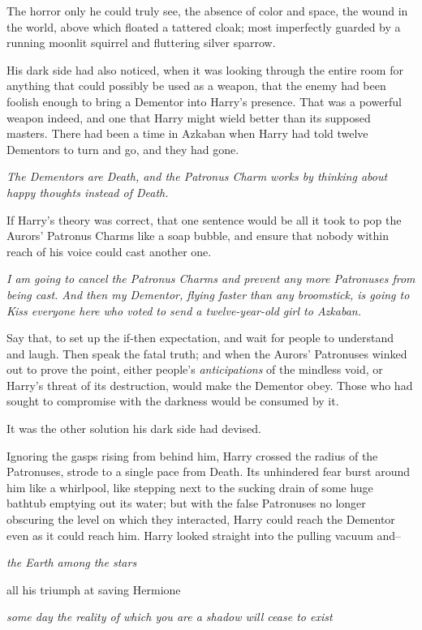 The horror only he could truly see, the absence of color and space, the wound in the world, above which floated a tattered cloak; most imperfectly guarded by a running moonlit squirrel and fluttering silver sparrow.

His dark side had also noticed, when it was looking through the entire room for anything that could possibly be used as a weapon, that the enemy had been foolish enough to bring a Dementor into Harry's presence. That was a powerful weapon indeed, and one that Harry might wield better than its supposed masters. There had been a time in Azkaban when Harry had told twelve Dementors to turn and go, and they had gone.

\emph{The Dementors are Death, and the Patronus Charm works by thinking about happy thoughts instead of Death.}

If Harry's theory was correct, that one sentence would be all it took to pop the Aurors' Patronus Charms like a soap bubble, and ensure that nobody within reach of his voice could cast another one.

\emph{I am going to cancel the Patronus Charms and prevent any more Patronuses from being cast. And then my Dementor, flying faster than any broomstick, is going to Kiss everyone here who voted to send a twelve-year-old girl to Azkaban.}

Say that, to set up the if-then expectation, and wait for people to understand and laugh. Then speak the fatal truth; and when the Aurors' Patronuses winked out to prove the point, either people's \emph{anticipations} of the mindless void, or Harry's threat of its destruction, would make the Dementor obey. Those who had sought to compromise with the darkness would be consumed by it.

It was the other solution his dark side had devised.

Ignoring the gasps rising from behind him, Harry crossed the radius of the Patronuses, strode to a single pace from Death. Its unhindered fear burst around him like a whirlpool, like stepping next to the sucking drain of some huge bathtub emptying out its water; but with the false Patronuses no longer obscuring the level on which they interacted, Harry could reach the Dementor even as it could reach him. Harry looked straight into the pulling vacuum and\---

\emph{the Earth among the stars}

all his triumph at saving Hermione

\emph{some day the reality of which you are a shadow will cease to exist}

